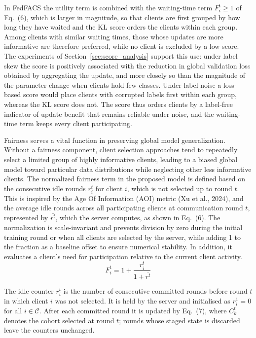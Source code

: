 \documentclass[pdflatex,sn-mathphys-num,oneside]{sn-jnl}%
\theoremstyle{thmstyleone}%
\theoremstyle{thmstyletwo}%
\theoremstyle{thmstylethree}%
\begin{document}
In FedFACS the utility term is combined with the waiting-time term $F_i^t\ge 1$ of Eq.~(6), which is larger in magnitude, so that clients are first grouped by how long they have waited and the KL score orders the clients within each group. Among clients with similar waiting times, those whose updates are more informative are therefore preferred, while no client is excluded by a low score. The experiments of Section~\ref{sec:score_analysis} support this use: under label skew the score is positively associated with the reduction in global validation loss obtained by aggregating the update, and more closely so than the magnitude of the parameter change when clients hold few classes. Under label noise a loss-based score would place clients with corrupted labels first within each group, whereas the KL score does not. The score thus orders clients by a label-free indicator of update benefit that remains reliable under noise, and the waiting-time term keeps every client participating.

Fairness serves a vital function in preserving global model generalization. Without a fairness component, client selection approaches tend to repeatedly select a limited group of highly informative clients, leading to a biased global model toward particular data distributions while neglecting other less informative clients. The normalized fairness term in the proposed model is defined based on the consecutive idle rounds $r_i^t$ for client $i$, which is not selected up to round $t$. This is inspired by the Age Of Information (AOI) metric (Xu et al., 2024), and the average idle rounds across all participating clients at communication round $t$, represented by $\overline{r^t}$, which the server computes, as shown in Eq.~(6). The normalization is scale-invariant and prevents division by zero during the initial training round or when all clients are selected by the server, while adding 1 to the fraction as a baseline offset to ensure numerical stability. In addition, it evaluates a client’s need for participation relative to the current client activity.
\begin{equation}
F_i^t = 1 + \frac{r_i^t}{1 + \overline{r^t}}
\label{eq:fairness}
\end{equation}

The idle counter $r_i^t$ is the number of consecutive committed rounds before round $t$ in which client $i$ was not selected. It is held by the server and initialised as $r_i^1=0$ for all $i\in\mathcal{C}$. After each committed round it is updated by Eq.~(7), where $C_k^t$ denotes the cohort selected at round $t$; rounds whose staged state is discarded leave the counters unchanged.
\end{document}
